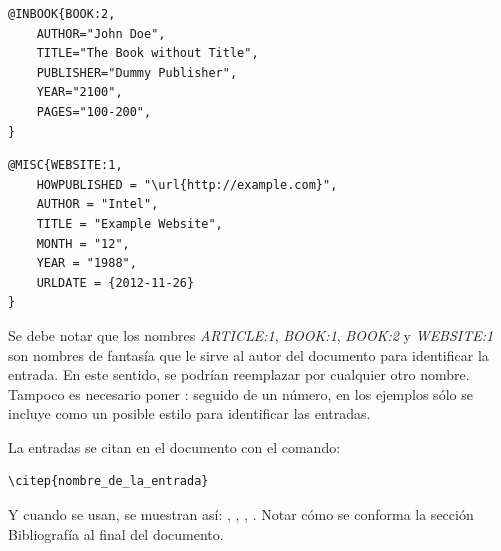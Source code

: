 \begin{lstlisting}
@INBOOK{BOOK:2,
    AUTHOR="John Doe",
    TITLE="The Book without Title",
    PUBLISHER="Dummy Publisher",
    YEAR="2100",
    PAGES="100-200",
}
\end{lstlisting}


\begin{lstlisting}
@MISC{WEBSITE:1,
    HOWPUBLISHED = "\url{http://example.com}",
    AUTHOR = "Intel",
    TITLE = "Example Website",
    MONTH = "12",
    YEAR = "1988",
    URLDATE = {2012-11-26}
}
\end{lstlisting}

Se debe notar que los nombres \emph{ARTICLE:1}, \emph{BOOK:1}, \emph{BOOK:2} y \emph{WEBSITE:1} son nombres de fantasía que le sirve al autor del documento para identificar la entrada. En este sentido, se podrían reemplazar por cualquier otro nombre.  Tampoco es necesario poner : seguido de un número, en los ejemplos sólo se incluye como un posible estilo para identificar las entradas.

La entradas se citan en el documento con el comando: 

\begin{verbatim}
\citep{nombre_de_la_entrada}
\end{verbatim}

Y cuando se usan, se muestran así: \citep{ARTICLE:1}, \citep{BOOK:1}, \citep{BOOK:2}, \citep{WEBSITE:1}.  Notar cómo se conforma la sección Bibliografía al final del documento. 
